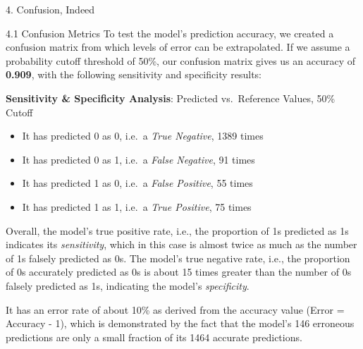 \documentclass[
  ignorenonframetext,
]{beamer}
\newenvironment{Shaded}{\begin{snugshade}}{\end{snugshade}}
\newcommand{\AttributeTok}[1]{\textcolor[rgb]{0.77,0.63,0.00}{#1}}
\newcommand{\DecValTok}[1]{\textcolor[rgb]{0.00,0.00,0.81}{#1}}
\newcommand{\FunctionTok}[1]{\textcolor[rgb]{0.00,0.00,0.00}{#1}}
\newcommand{\NormalTok}[1]{#1}
\newcommand{\OtherTok}[1]{\textcolor[rgb]{0.56,0.35,0.01}{#1}}
\newcommand{\SpecialCharTok}[1]{\textcolor[rgb]{0.00,0.00,0.00}{#1}}
\newcommand{\StringTok}[1]{\textcolor[rgb]{0.31,0.60,0.02}{#1}}
\providecommand{\tightlist}{%
  \setlength{\itemsep}{0pt}\setlength{\parskip}{0pt}}
\begin{document}
\begin{frame}[fragile]{4. Confusion, Indeed}
\protect\hypertarget{confusion-indeed}{}
\begin{block}{4.1 Confusion Metrics}
\protect\hypertarget{confusion-metrics}{}
To test the model's prediction accuracy, we created a confusion matrix
from which levels of error can be extrapolated. If we assume a
probability cutoff threshold of 50\%, our confusion matrix gives us an
accuracy of \textbf{0.909}, with the following sensitivity and
specificity results:

\textbf{Sensitivity \& Specificity Analysis}: Predicted vs.~Reference
Values, 50\% Cutoff

\begin{itemize}
\tightlist
\item
  It has predicted 0 as 0, i.e.~a \emph{True Negative}, 1389 times
\item
  It has predicted 0 as 1, i.e.~a \emph{False Negative}, 91 times
\item
  It has predicted 1 as 0, i.e.~a \emph{False Positive}, 55 times
\item
  It has predicted 1 as 1, i.e.~a \emph{True Positive}, 75 times
\end{itemize}

Overall, the model's true positive rate, i.e., the proportion of 1s
predicted as 1s indicates its \emph{sensitivity}, which in this case is
almost twice as much as the number of 1s falsely predicted as 0s. The
model's true negative rate, i.e., the proportion of 0s accurately
predicted as 0s is about 15 times greater than the number of 0s falsely
predicted as 1s, indicating the model's \emph{specificity}.

It has an error rate of about 10\% as derived from the accuracy value
(Error = Accuracy - 1), which is demonstrated by the fact that the
model's 146 erroneous predictions are only a small fraction of its 1464
accurate predictions.

\begin{Shaded}
\end{Shaded}


\end{block}
\end{frame}
\end{document}
